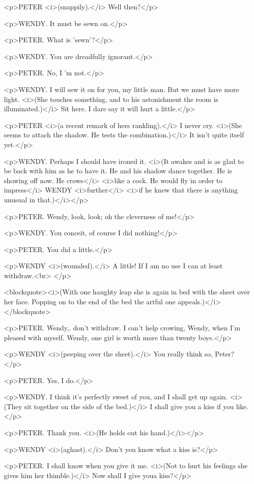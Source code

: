 <p>PETER <i>(snappily).</i> Well then?</p>

<p>WENDY. It must be sewn on.</p>

<p>PETER. What is 'sewn'?</p>

<p>WENDY. You are dreadfully ignorant.</p>

<p>PETER. No, I 'm not.</p>

<p>WENDY. I will sew it on for you, my little man. But we must have
more light. <i>(She touches something, and to his astonishment the
room is illuminated.)</i> Sit here. I dare say it will hurt a
little.</p>

<p>PETER <i>(a recent remark of hers rankling).</i> I never cry.
<i>(She seems to attach the shadow. He tests the combination.)</i> It
isn't quite itself yet.</p>

<p>WENDY. Perhaps I should have ironed it. <i>(It awakes and is as
glad to be back with him as he to have it. He and his shadow dance
together. He is showing off now. He crows</i> <i>like a cock. He
would fly in order to impress</i> WENDY <i>further</i> <i>if he knew
that there is anything unusual in that.)</i></p>

<p>PETER. Wendy, look, look; oh the cleverness of me!</p>

<p>WENDY. You conceit, of course I did nothing!</p>

<p>PETER. You did a little.</p>

<p>WENDY <i>(wounded).</i> A little! If I am no use I can at least
withdraw.<br>
</p>

<blockquote><i>(With one haughty leap she is again in bed with the
sheet over her face. Popping on to the end of the bed the artful one
appeals.)</i></blockquote>

<p>PETER. Wendy,. don't withdraw. I can't help crowing, Wendy, when
I'm pleased with myself. Wendy, one girl is worth more than twenty
boys.</p>

<p>WENDY <i>(peeping over the sheet).</i> You really think so,
Peter?</p>

<p>PETER. Yes, I do.</p>

<p>WENDY. I think it's perfectly sweet of you, and I shall get up
again. <i>(They sit together on the side of the bed.)</i> I shall
give you a kiss if you like.</p>

<p>PETER. Thank you. <i>(He holds out his hand.)</i></p>

<p>WENDY <i>(aghast).</i> Don't you know what a kiss is?</p>

<p>PETER. I shall know when you give it me. <i>(Not to hurt his
feelings she gives him her thimble.)</i> Now shall I give youa
kiss?</p>

